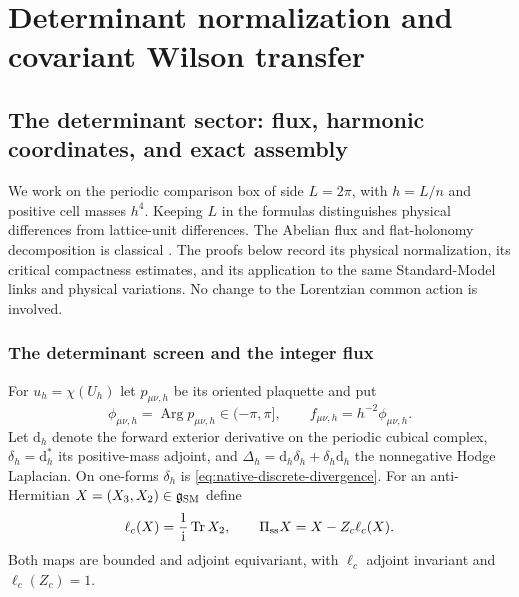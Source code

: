 \documentclass[11pt]{article}
\numberwithin{equation}{section}
\theoremstyle{definition}
\theoremstyle{remark}
\newcommand{\dd}{\mathrm d}
\newcommand{\ii}{\mathrm i}
\newcommand{\Tr}{\operatorname{Tr}}
\begin{document}
\section{Determinant normalization and covariant Wilson transfer}
\label{app:determinant-transfer}

\subsection{The determinant sector: flux, harmonic coordinates, and exact assembly}
\label{app:determinant-sector}

We work on the periodic comparison box of side $L=2\pi$, with $h=L/n$
and positive cell masses $h^4$.  Keeping $L$ in the formulas distinguishes
physical differences from lattice-unit differences.  The Abelian
flux and flat-holonomy decomposition is classical
\cite[Section~7]{Luscher1999}.  The proofs below record its physical
normalization, its critical compactness estimates, and its application to
the same Standard-Model links and physical variations.  No change to the
Lorentzian common action is involved.

\subsubsection{The determinant screen and the integer flux}

For $u_h=\chi(U_h)$ let $p_{\mu\nu,h}$ be its oriented plaquette and put
\begin{equation}
 \phi_{\mu\nu,h}=\operatorname{Arg}p_{\mu\nu,h}\in(-\pi,\pi],\qquad
 f_{\mu\nu,h}=h^{-2}\phi_{\mu\nu,h}.
 \label{eq:determinant-real-curvature}
\end{equation}
Let $\dd_h$ denote the forward exterior derivative on the periodic cubical
complex, $\delta_h=\dd_h^*$ its positive-mass adjoint, and
$\Delta_h=\dd_h\delta_h+\delta_h\dd_h$ the nonnegative Hodge Laplacian.
On one-forms $\delta_h$ is \eqref{eq:native-discrete-divergence}.
For an anti-Hermitian $X=(X_3,X_2)\in\mathfrak g_{\rm SM}$ define
\begin{equation}
 \ell_c(X)=\frac1{\ii}\Tr X_2,\qquad
 \Pi_{\rm ss}X=X-Z_c\ell_c(X).
 \label{eq:determinant-projections}
\end{equation}
Both maps are bounded and adjoint equivariant, with $\ell_c$ adjoint
invariant and $\ell_c(Z_c)=1$.
\end{document}
